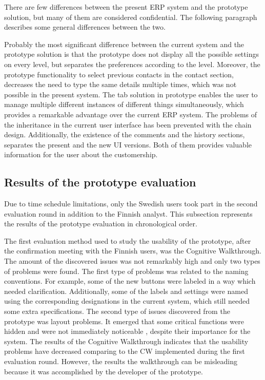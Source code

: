 \documentclass[12pt,a4paper,oneside,pdftex]{report}
\begin{document}
There are few differences between the present ERP system and the prototype solution, but many of them are considered confidential. The following paragraph describes some general differences between the two.

Probably the most significant difference between the current system and the prototype solution is that the prototype does not display all the possible settings on every level, but separates the preferences according to the level. Moreover, the prototype functionality to select previous contacts in the contact section, decreases the need to type the same details multiple times, which was not possible in the present system. The tab solution in prototype enables the user to manage multiple different instances of different things simultaneously, which provides a remarkable advantage over the current ERP system. The problems of the inheritance in the current user interface has been prevented with the chain design. Additionally, the existence of the comments and the history sections, separates the present and the new UI versions. Both of them provides valuable information for the user about the customership.

\subsection{Results of the prototype evaluation}

Due to time schedule limitations, only the Swedish users took part in the second evaluation round in addition to the Finnish analyst. This subsection represents the results of the prototype evaluation in chronological order. 

The first evaluation method used to study the usability of the prototype, after the confirmation meeting with the Finnish users, was the Cognitive Walkthrough. The amount of the discovered issues was not remarkably high and only two types of problems were found. The first type of problems was related to the naming conventions. For example, some of the new buttons were labeled in a way which needed clarification. Additionally, some of the labels and settings were named using the corresponding designations in the current system, which still needed some extra specifications. The second type of issues discovered from the prototype was layout problems. It emerged that some critical functions were hidden and were not immediately noticeable , despite their importance for the system. The results of the Cognitive Walkthrough indicates that the usability problems have decreased comparing to the CW implemented during the first evaluation round. However, the results the walkthrough can be misleading because it was accomplished by the developer of the prototype.
\end{document}
